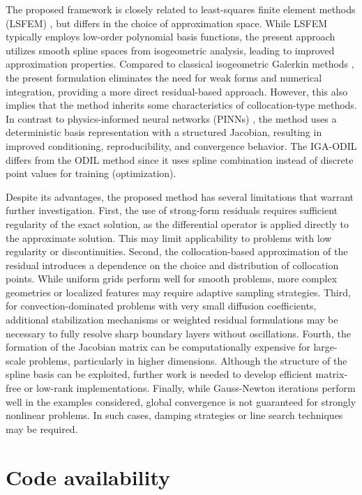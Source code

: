 \documentclass[review]{elsarticle}
\begin{document}
The proposed framework is closely related to least-squares finite element methods (LSFEM) \cite{bochev2009least}, but differs in the choice of approximation space. While LSFEM typically employs low-order polynomial basis functions, the present approach utilizes smooth spline spaces from isogeometric analysis, leading to improved approximation properties.
Compared to classical isogeometric Galerkin methods \cite{iga}, the present formulation eliminates the need for weak forms and numerical integration, providing a more direct residual-based approach. However, this also implies that the method inherits some characteristics of collocation-type methods.
In contrast to physics-informed neural networks (PINNs) \cite{raissi}, the method uses a deterministic basis representation with a structured Jacobian, resulting in improved conditioning, reproducibility, and convergence behavior.
The IGA-ODIL differs from the ODIL method \cite{odil} since it uses spline combination instead of discrete point values for training (optimization).

Despite its advantages, the proposed method has several limitations that warrant further investigation.
First, the use of strong-form residuals requires sufficient regularity of the exact solution, as the differential operator is applied directly to the approximate solution. This may limit applicability to problems with low regularity or discontinuities.
Second, the collocation-based approximation of the residual introduces a dependence on the choice and distribution of collocation points. While uniform grids perform well for smooth problems, more complex geometries or localized features may require adaptive sampling strategies.
Third, for convection-dominated problems with very small diffusion coefficients, additional stabilization mechanisms or weighted residual formulations may be necessary to fully resolve sharp boundary layers without oscillations.
Fourth, the formation of the Jacobian matrix can be computationally expensive for large-scale problems, particularly in higher dimensions. Although the structure of the spline basis can be exploited, further work is needed to develop efficient matrix-free or low-rank implementations.
Finally, while Gauss-Newton iterations perform well in the examples considered, global convergence is not guaranteed for strongly nonlinear problems. In such cases, damping strategies or line search techniques may be required.

\appendix
\section{Code availability}
\end{document}
